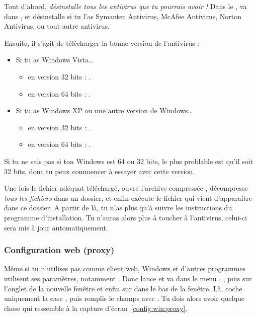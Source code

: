 Tout d'abord, \emph{d\'esinstalle tous les antivirus que tu pourrais
avoir !} Dans le , va dans ,  et
d\'esinstalle si tu l'as Symantec Antivirus, McAfee Antivirus, Norton
Antivirus, ou tout autre antivirus.

Ensuite, il s'agit de t\'el\'echarger la bonne version de l'antivirus :
\begin{itemize}

\item Si tu as Windows Vista\dots
\begin{itemize}
\item en version 32 bits : .
\item en version 64 bits : .
\end{itemize}

\item Si tu as Windows XP ou une autre version de Windows\dots
\begin{itemize}
\item en version 32 bits : .
\item en version 64 bits : .
\end{itemize}
\end{itemize}

Si tu ne sais pas si ton Windows est 64 ou 32 bits, le plus problable est qu'il
soit 32 bits, donc tu peux commencer \`a essayer avec cette version.

Une fois le fichier ad\'equat t\'el\'echarg\'e, ouvre l'archive compress\'ee , d\'ecompresse \emph{tous les fichiers} dans un dossier, et
enfin ex\'ecute le fichier  qui vient d'apparaitre dans ce dossier. A partir de l\`a, tu n'as plus qu'\`a suivre les instructions du
programme d'installation. Tu n'auras alors plus \`a toucher \`a l'antivirus, celui-ci sera mis \`a jour automatiquement.


\subsubsection{Configuration web (proxy)}


M\^eme si tu n'utilises pas  comme client web, Windows et d'autres programmes
utilisent ses param\`etres, notamment . Donc lance  et va
dans le menu , , puis sur l'onglet  de la
nouvelle fen\^etre et enfin sur  dans le bas de la fen\^etre. L\`a, coche
uniquement la case , puis remplis le champs
 avec . Tu dois alors avoir quelque chose qui
ressemble \`a la capture d'\'ecran~\ref{config:win:proxy}.


